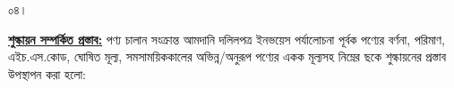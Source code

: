 \documentclass[12pt]{article}
\newcommand{\ircno}{\jealirc}
\newcommand{\ircrenewdt}{৩০/০৬/২০২২ ইং}
\newcommand{\musokr}{জানুয়ারী-২২}
\begin{document}
\begin{minipage}[t]{0.05\linewidth}
০৪।
\end{minipage}
\begin{minipage}[t]{0.95\linewidth}
\underline{\textbf{শুল্কায়ন সম্পর্কিত প্রস্তাব:}}
পণ্য চালান সংক্রান্ত আমদানি দলিলপত্র
ইনভয়েস পর্যালোচনা পূর্বক পণ্যের বর্ণনা, পরিমাণ, এইচ.এস.কোড, ঘোষিত মূল্য,
সমসাময়িককালের অভিন্ন/অনুরূপ পণ্যের একক মূল্যসহ নিম্নের ছকে শুল্কায়নের প্রস্তাব উপস্থাপন
করা হলো:
\end{minipage}
\end{document}
